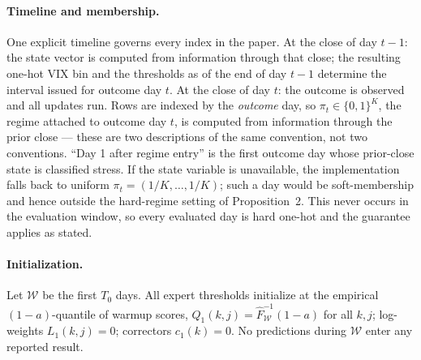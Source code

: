 \paragraph{Timeline and membership.} One explicit timeline governs every
index in the paper. At the close of day $t-1$: the state vector is
computed from information through that close; the resulting one-hot VIX
bin and the thresholds as of the end of day $t-1$ determine the interval
issued for outcome day $t$. At the close of day $t$: the outcome is
observed and all updates run. Rows are indexed by the \emph{outcome}
day, so $\pi_t \in \{0,1\}^K$, the regime attached to outcome day $t$,
is computed from information through the prior close --- these are two
descriptions of the same convention, not two conventions. ``Day 1 after
regime entry'' is the first outcome day whose prior-close state is
classified stress. If the state variable is unavailable, the
implementation falls back to uniform $\pi_t = (1/K, \ldots, 1/K)$; such
a day would be soft-membership and hence outside the hard-regime setting
of Proposition~2. This never occurs in the evaluation window, so every
evaluated day is hard one-hot and the guarantee applies as stated.

\paragraph{Initialization.} Let $\mathcal{W}$ be the first $T_0$ days.
All expert thresholds initialize at the empirical $(1-a)$-quantile of
warmup scores, $Q_1(k, j) = \widehat{F}^{-1}_{\mathcal{W}}(1 - a)$ for
all $k, j$; log-weights $L_1(k, j) = 0$; correctors $c_1(k) = 0$. No
predictions during $\mathcal{W}$ enter any reported result.

